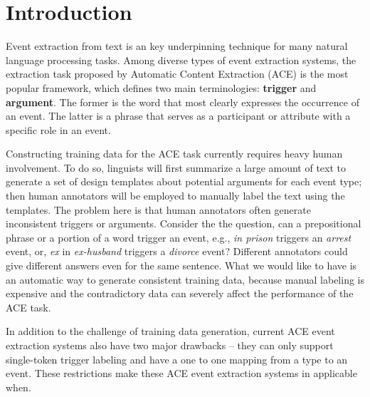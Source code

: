 \section{Introduction}
Event extraction from text is an key underpinning technique for many natural language processing tasks.
Among diverse types of event extraction systems, the extraction task proposed by Automatic Content Extraction (ACE)
\cite{doddington2004automatic} is the most popular framework, which defines two main terminologies: \textbf{trigger}
and \textbf{argument}. The former is the word that most clearly expresses the occurrence of an event. The latter is a
phrase that serves as a participant or attribute with a specific role in an event.

Constructing training data for the ACE task currently requires heavy human involvement. To do so, linguists will first
summarize a large amount of text to generate a set of design templates about potential arguments for each event type;
then human annotators will be employed to manually label the text using the templates. The problem here is that human
annotators often generate inconsistent triggers or arguments. Consider the the question, can a prepositional phrase or
a portion of a word trigger an event, e.g., \textit{in prison} triggers an \emph{arrest} event, or, \textit{ex} in
\textit{ex-husband} triggers a \emph{divorce} event? Different annotators could give different answers even for the
same sentence. What we would like to have is an automatic way to generate consistent training data, because manual labeling is
expensive and
the contradictory data can severely affect the performance of the ACE task.

In addition to the challenge of training data generation, current ACE event extraction systems
also have two major drawbacks -- they can only support single-token trigger labeling and have
a one to one mapping from a type to an event. These restrictions make these ACE event extraction
systems in applicable when. 



